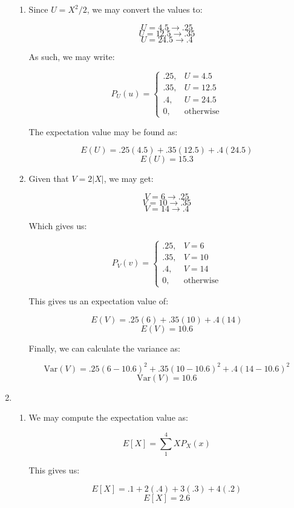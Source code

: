 \begin{enumerate}
\begin{enumerate}
        \item Since $U=X^2/2$, we may convert the values to:

        $$U=4.5\to .25$$
        $$U=12.5\to .35$$
        $$U=24.5\to .4$$

        As such, we may write:

        $$\boxed{P_U(u)=\left\{\begin{array}{ll} .25, & U=4.5\\ .35, & U=12.5\\ .4, & U=24.5\\ 0, & \text{otherwise} \end{array}}$$

        The expectation value may be found as:

        $$E(U)=.25(4.5)+.35(12.5)+.4(24.5)$$
        $$\boxed{E(U)=15.3}$$

      \item Given that $V=2|X|$, we may get:

        $$V=6\to .25$$
        $$V=10\to .35$$
        $$V=14\to .4$$

        Which gives us:

        $$\boxed{P_V(v)=\left\{\begin{array}{ll} .25, & V=6\\ .35, & V=10\\ .4, & V=14\\ 0, & \text{otherwise} \end{array}}$$

        This gives us an expectation value of:

        $$E(V)=.25(6)+.35(10)+.4(14)$$
        $$\boxed{E(V)=10.6}$$

        Finally, we can calculate the variance as:

        $$\text{Var}(V)=.25(6-10.6)^2+.35(10-10.6)^2+.4(14-10.6)^2$$
        $$\boxed{\text{Var}(V)=10.6}$$

    \end{enumerate}

  \item 

    \begin{enumerate}

      \item We may compute the expectation value as:

        $$E[X]=\sum_{1}^4 XP_X(x)$$

        This gives us:

        $$E[X]=.1+2(.4)+3(.3)+4(.2)$$
        $$\boxed{E[X]=2.6}$$


\end{enumerate}
\end{enumerate}
